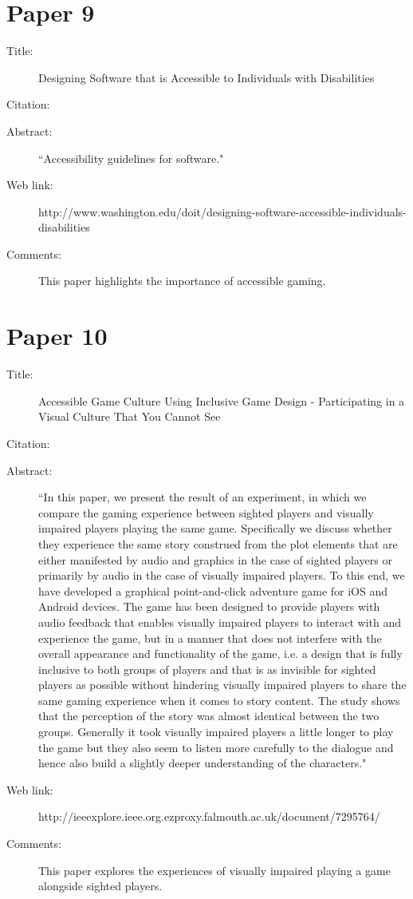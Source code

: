 \documentclass{scrartcl}
\begin{document}
\section*{Paper 9}
\begin{description}
\item[Title:] Designing Software that is Accessible to Individuals with Disabilities
\item[Citation:] \cite{doittwo}
\item[Abstract:] ``Accessibility guidelines for software."
\item[Web link:] http://www.washington.edu/doit/designing-software-accessible-individuals-disabilities
\item[Comments:] This paper highlights the importance of accessible gaming.
\end{description}

\section*{Paper 10}
\begin{description}
\item[Title:] Accessible Game Culture Using Inclusive Game Design - Participating in a Visual Culture That You Cannot See
\item[Citation:] \cite{Wihelmsson} 
\item[Abstract:] ``In this paper, we present the result of an experiment, in which we compare the gaming experience between sighted players and visually impaired players playing the same game. Specifically we discuss whether they experience the same story construed from the plot elements that are either manifested by audio and graphics in the case of sighted players or primarily by audio in the case of visually impaired players. To this end, we have developed a graphical point-and-click adventure game for iOS and Android devices. The game has been designed to provide players with audio feedback that enables visually impaired players to interact with and experience the game, but in a manner that does not interfere with the overall appearance and functionality of the game, i.e. a design that is fully inclusive to both groups of players and that is as invisible for sighted players as possible without hindering visually impaired players to share the same gaming experience when it comes to story content. The study shows that the perception of the story was almost identical between the two groups. Generally it took visually impaired players a little longer to play the game but they also seem to listen more carefully to the dialogue and hence also build a slightly deeper understanding of the characters."
\item[Web link:] http://ieeexplore.ieee.org.ezproxy.falmouth.ac.uk/document/7295764/
\item[Comments:] This paper explores the experiences of visually impaired playing a game alongside sighted players.
\end{description}
\end{document}
